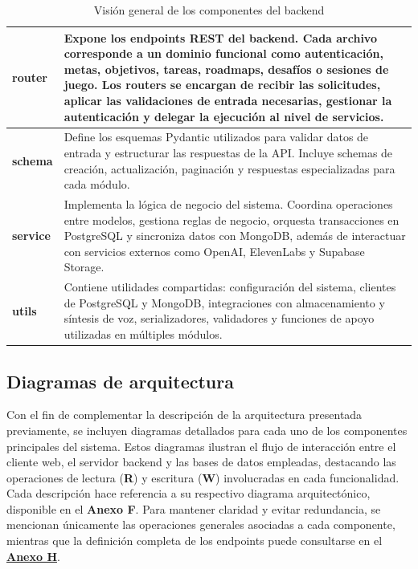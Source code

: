 \begin{table}[H]
\begin{tabular}{|p{3cm}|p{11cm}|}
\textbf{router} &
Expone los endpoints REST del backend. Cada archivo corresponde a un dominio funcional como
autenticación, metas, objetivos, tareas, roadmaps, desafíos o sesiones de juego. Los routers se encargan de recibir las solicitudes, aplicar las validaciones de entrada necesarias,
gestionar la autenticación y delegar la ejecución al nivel de servicios.
\\
\hline

\textbf{schema} &
Define los esquemas Pydantic utilizados para validar datos de entrada y estructurar las
respuestas de la API. Incluye schemas de creación, actualización, paginación y respuestas
especializadas para cada módulo. \\
\hline

\textbf{service} &
Implementa la lógica de negocio del sistema. Coordina operaciones entre modelos, gestiona reglas
de negocio, orquesta transacciones en PostgreSQL y sincroniza datos con MongoDB, además de
interactuar con servicios externos como OpenAI, ElevenLabs y Supabase Storage. \\
\hline

\textbf{utils} &
Contiene utilidades compartidas: configuración del sistema, clientes de PostgreSQL y MongoDB,
integraciones con almacenamiento y síntesis de voz, serializadores, validadores y funciones de
apoyo utilizadas en múltiples módulos. \\
\hline

\end{tabular}
\caption{Visión general de los componentes del backend}
\label{tab:componentes_backend}
\end{table}

\subsection{Diagramas de arquitectura}

Con el fin de complementar la descripción de la arquitectura presentada previamente, se incluyen diagramas detallados para cada uno de los componentes principales del sistema. Estos diagramas ilustran el flujo de interacción entre el cliente web, el servidor backend y las bases de datos empleadas, destacando las operaciones de lectura (\textbf{R}) y escritura (\textbf{W}) involucradas en cada funcionalidad.
\\

Cada descripción hace referencia a su respectivo diagrama arquitectónico, disponible en el \textbf{Anexo F}. Para mantener claridad y evitar redundancia, se mencionan únicamente las operaciones generales asociadas a cada componente, mientras que la definición completa de los endpoints puede consultarse en el \hyperref[anexo:endpoints]{\textbf{Anexo H}}.

